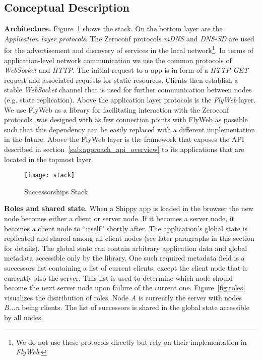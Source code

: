 \subsection{Conceptual Description}
\label{sub:approach_conceptual_description}

\textbf{Architecture.} Figure~\ref{fig:stack} shows the \APIName stack.
On the bottom layer are the \textit{Application layer protocols}.
The Zeroconf protocols \textit{mDNS} and \textit{DNS-SD} are used for the advertisement and discovery of \APIshort services in the local network\footnote{We do not use these protocols directly but rely on their implementation in \textit{FlyWeb}.}. 
In terms of application-level network communication we use the common protocols of \textit{WebSocket} and \textit{HTTP}. 
The initial request to a \APIshort app is in form of a \textit{HTTP GET} request and associated requests for static resources.  Clients then establish a stable \textit{WebSocket} channel that is used for further communication between nodes (e.g. state replication). 
Above the application layer protocols is the \textit{FlyWeb} layer. 
We use FlyWeb as a library for facilitating interaction with the Zeroconf protocols. 
\APIName was designed with as few connection points with FlyWeb as possible such that this dependency can be easily replaced with a different implementation in the future. 
Above the FlyWeb layer is the \textit{\APIName} framework that exposes the API described in section~\ref{sub:approach_api_overview} to its applications that are located in the topmost layer.

\begin{figure}[h]
    \centering
    \texttt{[image: stack]}
    \caption{Successorships Stack}
    \label{fig:stack}
\end{figure}

\noindent\textbf{Roles and shared state.} When a Shippy app is loaded in the browser the new node becomes either a client or server node. If it becomes a server node, it becomes a client node to ``itself'' shortly after. The application's global state is replicated and shared among all client nodes (see later paragraphs in this section for details). The global state can contain arbitrary application data and global metadata accessible only by the \APIshort library. One such required metadata field is a {\ttfamily successors} list containing a list of current clients, except the client node that is currently also the server. This list is used to determine which node should become the next server node upon failure of the current one. Figure~\ref{fig:roles} visualizes the distribution of roles. Node \textit{A} is currently the server with nodes \textit{B...n} being clients. The list of successors is shared in the global state accessible by all nodes.

